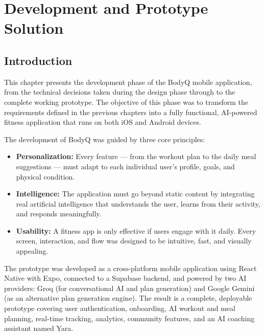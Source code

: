 
\chapter{Development and Prototype Solution}

\section{Introduction}

This chapter presents the development phase of the BodyQ mobile application,
from the technical decisions taken during the design phase through to the
complete working prototype. The objective of this phase was to transform the
requirements defined in the previous chapters into a fully functional,
AI-powered fitness application that runs on both iOS and Android devices.

The development of BodyQ was guided by three core principles:

\begin{itemize}
    \item \textbf{Personalization:} Every feature — from the workout plan to
    the daily meal suggestions — must adapt to each individual user's profile,
    goals, and physical condition.

    \item \textbf{Intelligence:} The application must go beyond static content
    by integrating real artificial intelligence that understands the user,
    learns from their activity, and responds meaningfully.

    \item \textbf{Usability:} A fitness app is only effective if users engage
    with it daily. Every screen, interaction, and flow was designed to be
    intuitive, fast, and visually appealing.
\end{itemize}

The prototype was developed as a cross-platform mobile application using
React Native with Expo, connected to a Supabase backend, and powered by two
AI providers: Groq (for conversational AI and plan generation) and Google
Gemini (as an alternative plan generation engine). The result is a complete,
deployable prototype covering user authentication, onboarding, AI workout and
meal planning, real-time tracking, analytics, community features, and an AI
coaching assistant named Yara.

